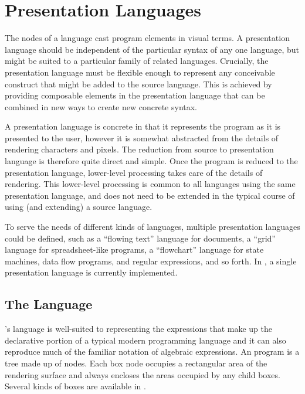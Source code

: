 %
%

\section{Presentation Languages}
The nodes of a  language cast program elements in visual terms. A presentation language should be independent of the particular syntax of any one language, but might be suited to a particular family of related languages. Crucially, the presentation language must be flexible enough to represent any conceivable construct that might be added to the source language. This is achieved by providing composable elements in the presentation language that can be combined in new ways to create new concrete syntax.

A presentation language is concrete in that it represents the program as it is presented to the user, however it is somewhat abstracted from the details of rendering characters and pixels. The reduction from source to presentation language is therefore quite direct and simple. Once the program is reduced to the presentation language, lower-level processing takes care of the details of rendering. This lower-level processing is common to all languages using the same presentation language, and does not need to be extended in the typical course of using (and extending) a source language.

To serve the needs of different kinds of languages, multiple presentation languages could be defined, such as a ``flowing text'' language for documents, a ``grid'' language for spreadsheet-like programs, a ``flowchart'' language for state machines, data flow programs, and regular expressions, and so forth. In \Meta, a single presentation language is currently implemented.

\subsection{The  Language}


\Meta's  language is well-suited to representing the expressions that make up the declarative portion of a typical modern programming language and it can also reproduce much of the familiar notation of algebraic expressions. An  program is a tree made up of  nodes. Each box node occupies a rectangular area of the rendering surface and always encloses the areas occupied by any child boxes. Several kinds of boxes are available in .

